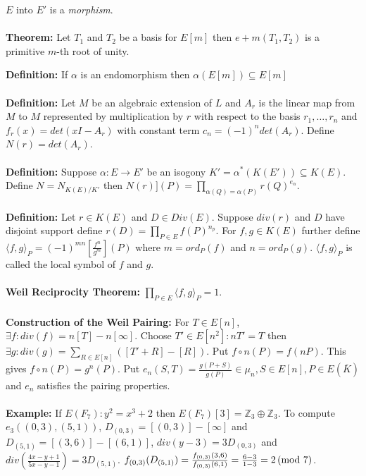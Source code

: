 $E$ into $E'$ is a \emph{morphism}.
\\
\\
{\bf Theorem:} 
Let $T_1$ and $T_2$ be a basis for $E[m]$ then $e+m(T_1 , T_2 )$ is a primitive
$m$-th root of unity.
\begin{quote}
\end{quote}
{\bf Definition:} 
If $\alpha$ is an endomorphism then $\alpha(E[m]) \subseteq E[m]$
\\
\\
{\bf Definition:} 
Let $M$ be an algebraic extension of $L$ and $A_r$ is the linear map from $M$
to $M$ represented by multiplication by $r$ with respect to the basis
$r_1 , \ldots , r_n$ and $f_r(x)= det(xI-A_r)$ with constant term 
$c_n = (-1)^n det(A_r)$.  Define $N(r)= det(A_r)$.
\\
\\
{\bf Definition:} 
Suppose $\alpha: E \rightarrow E'$ be an isogony $K'= \alpha^*(K(E')) \subseteq K(E)$.
Define $N= N_{K(E)/K'}$ then $N(r)](P)= \prod_{\alpha(Q)= \alpha(P)} r(Q)^{e_{\alpha}}$.
\\
\\
{\bf Definition:} 
Let $r \in K(E)$ and $D \in Div(E)$.  Suppose $div(r)$ and $D$ have disjoint support
define $r(D)= \prod_{P \in E} f(P)^{n_p}$.  For $f, g \in K(E)$ further
define
$\langle f, g \rangle_P= (-1)^{mn} [{\frac {f^n}{g^m}}](P)$ where 
$m= ord_P(f)$ and
$n= ord_P(g)$.  $\langle f, g \rangle_P$ is called the local symbol of $f$ and $g$.
\\
\\
{\bf Weil Reciprocity Theorem:} $\prod_{P \in E} \langle f, g \rangle_P =1$.
\\
\\
{\bf Construction of the Weil Pairing:}
For $T \in E[n]$,
$\exists f: div(f)= n[T]- n[\infty]$.  Choose $T' \in E[n^2]: nT'=T$ then 
$\exists g: div(g) = \sum_{R \in E[n]} ([T'+R]-[R])$.  Put $f \circ n (P)= f(nP)$.
This gives $f \circ n(P)= g^n(P)$.  Put
$e_n(S,T)= {\frac {g(P+S)} {g(P)}} \in \mu_n,  S \in E[n], P \in E({\overline K})$ and
$e_n$ satisfies the pairing properties.
\\
\\
{\bf Example:}
If $E(F_7): y^2= x^3+2$ then $E(F_7)[3]= {\mathbb Z}_3 \oplus {\mathbb Z}_3$.  To
compute $e_3((0,3),(5,1))$, $D_{(0,3)}= [(0,3)]-[\infty]$ and
$D_{(5,1)}= [(3,6)]-[(6,1)]$, $div(y-3)= 3 D_{(0,3)}$ and 
$div({\frac {4x-y+1} {5x-y-1}})= 3 D_{(5,1)}$.
$f_{(0,3)}(D_{(5,1)})= {\frac {f_{(0,3)}(3,6)} {f_{(0,3)}(6,1)}}= 
{\frac {6-3} {1-3}}= 2 \thinspace \textnormal{(mod } 7 \textnormal{)}$.
